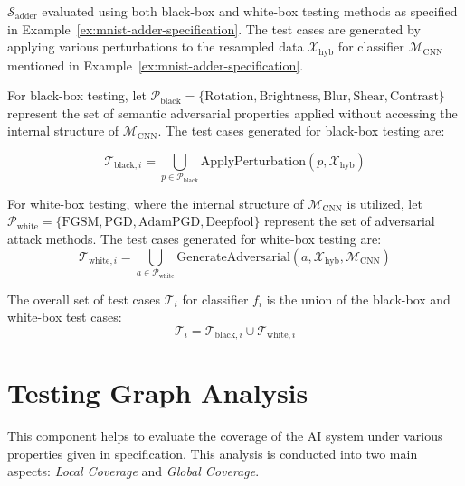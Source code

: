\begin{example}
  \label{ex:test-case-generation-math}
   $\mathcal{S}_{\text{adder}}$ evaluated using both black-box and white-box testing methods as specified in Example~\ref{ex:mnist-adder-specification}. The test cases are generated by applying various perturbations to the resampled data $\mathcal{X}_{\text{hyb}}$ for classifier $\mathcal{M}_{\text{CNN}}$ mentioned in Example~\ref{ex:mnist-adder-specification}.

  For black-box testing, let $\mathcal{P}_{\text{black}} = \{\text{Rotation}, \text{Brightness}, \text{Blur}, \text{Shear}, \text{Contrast}\}$ represent the set of semantic adversarial properties applied without accessing the internal structure of $\mathcal{M}_{\text{CNN}}$. The test cases generated for black-box testing are:
  
  \begin{equation}
  \mathcal{T}_{\text{black},i} = \bigcup_{p \in \mathcal{P}_{\text{black}}} \text{ApplyPerturbation}(p, \mathcal{X}_{\text{hyb}})
  \end{equation}
  
  For white-box testing, where the internal structure of $\mathcal{M}_{\text{CNN}}$ is utilized, let $\mathcal{P}_{\text{white}} = \{\text{FGSM}, \text{PGD}, \text{AdamPGD}, \text{Deepfool}\}$ represent the set of adversarial attack methods. The test cases generated for white-box testing are:
  \begin{equation}
  \mathcal{T}_{\text{white},i} = \bigcup_{a \in \mathcal{P}_{\text{white}}} \text{GenerateAdversarial}(a,\mathcal{X}_{\text{hyb}}, \mathcal{M}_{\text{CNN}})
  \end{equation}

  The overall set of test cases $\mathcal{T}_i$ for classifier $f_i$ is the union of the black-box and white-box test cases:
  \begin{equation}
  \mathcal{T}_i = \mathcal{T}_{\text{black},i} \cup \mathcal{T}_{\text{white},i}
  \end{equation}
\end{example}


\section{Testing Graph Analysis}

This component helps to evaluate the coverage of the AI system under various properties given in specification. This analysis is conducted into two main aspects: \emph{Local Coverage} and \emph{Global Coverage}.

